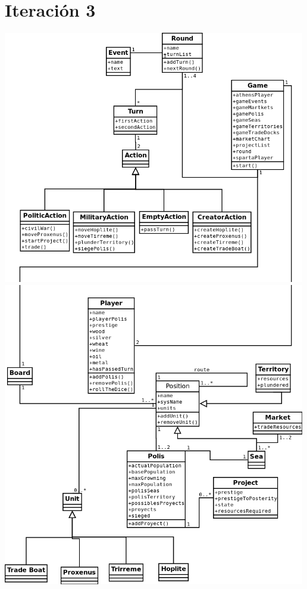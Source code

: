 \documentclass[11 pt]{book}
\begin{document}
	\section*{Iteración 3}
		\begin{center}
			\includegraphics[width=500px]{analysis-uml/iteration3/part1.png}
			\includegraphics[width=500px]{analysis-uml/iteration3/part2.png}
		\end{center}
	
\end{document}
